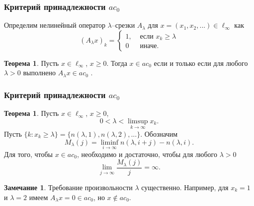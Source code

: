 \documentclass[10pt,pdf,hyperref={unicode},aspectratio=169]{beamer}
\theoremstyle{definition}
\newtheorem{ttheorem}[llemma]{Теорема}
\newtheorem{remark}[llemma]{Замечание}
\begin{document}
\begin{frame}
	\frametitle{Критерий принадлежности $ac_0$~\cite{our-mz2019ac0}}


	Определим нелинейный оператор $\lambda$--срезки $A_\lambda$
	для $x = (x_1, x_2, ...)\in\ell_\infty$ как
	\begin{equation*}
		(A_\lambda x)_k = \begin{cases}
			1, & \mbox{~если~} x_k \geq \lambda
			\\
			0  & \mbox{~иначе.~}
		\end{cases}
	\end{equation*}

	\begin{ttheorem}
		\label{thm:lambda_prelim}
		Пусть $x\in\ell_\infty$, $x\geq 0$.
		Тогда
		$
			x\in ac_0
		$
		если и только если
		для любого $\lambda > 0$
		выполнено
		$
			A_\lambda x \in ac_0
		$
		.
	\end{ttheorem}

\end{frame}



\begin{frame}
	\frametitle{Критерий принадлежности $ac_0$~\cite{our-mz2019ac0}}



	\begin{ttheorem}
		Пусть $x\in\ell_\infty$, $x \geq 0$,
		\begin{equation*}
			0<\lambda < \limsup_{k\to\infty} x_k
			.
		\end{equation*}
		Пусть $\{k: x_k \geq \lambda \} = \{n(\lambda,1),n(\lambda,2),...\}$.
		Обозначим
		\begin{equation*}
			M_{\lambda}(j) = \liminf_{i\to\infty} n(\lambda,i+j) - n(\lambda,i)
			.
		\end{equation*}
		Для того, чтобы $x\in ac_0$, необходимо и достаточно, чтобы
		для любого $\lambda>0$
		\begin{equation*}
			\lim_{j \to \infty} \frac{M_{\lambda}(j)}{j} = \infty
			.
		\end{equation*}
	\end{ttheorem}


	\begin{remark}
		Требование произвольности $\lambda$ существенно.
		Например, для $x_k = 1$ и $\lambda = 2$ имеем $A_\lambda x = 0 \in ac_0$,
		но $x\notin ac_0$.
	\end{remark}


\end{frame}
\end{document}
